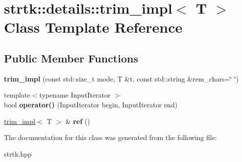 \hypertarget{classstrtk_1_1details_1_1trim__impl}{\section{strtk\-:\-:details\-:\-:trim\-\_\-impl$<$ T $>$ Class Template Reference}
\label{classstrtk_1_1details_1_1trim__impl}
}
\subsection*{Public Member Functions}
\begin{DoxyCompactItemize}
\item 
\hypertarget{classstrtk_1_1details_1_1trim__impl_a8cd042eaf2e952803eca2fb25a511cf5}{{\bfseries trim\-\_\-impl} (const std\-::size\-\_\-t mode, T \&t, const std\-::string \&rem\-\_\-chars=\char`\"{} \char`\"{})}\label{classstrtk_1_1details_1_1trim__impl_a8cd042eaf2e952803eca2fb25a511cf5}

\item 
\hypertarget{classstrtk_1_1details_1_1trim__impl_a3b60909ce93dddc08572a3e223043c64}{{\footnotesize template$<$typename Input\-Iterator $>$ }\\bool {\bfseries operator()} (Input\-Iterator begin, Input\-Iterator end)}\label{classstrtk_1_1details_1_1trim__impl_a3b60909ce93dddc08572a3e223043c64}

\item 
\hypertarget{classstrtk_1_1details_1_1trim__impl_a373bdc2fc369a2be3c21a6ef3ca76f29}{\hyperlink{classstrtk_1_1details_1_1trim__impl}{trim\-\_\-impl}$<$ T $>$ \& {\bfseries ref} ()}\label{classstrtk_1_1details_1_1trim__impl_a373bdc2fc369a2be3c21a6ef3ca76f29}

\end{DoxyCompactItemize}


The documentation for this class was generated from the following file\-:\begin{DoxyCompactItemize}
\item 
strtk.\-hpp\end{DoxyCompactItemize}
